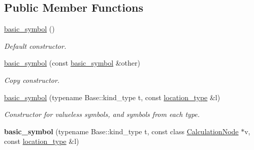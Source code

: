 \subsection*{Public Member Functions}
\begin{DoxyCompactItemize}
\item 
\hyperlink{structEzAquarii_1_1Parser_1_1basic__symbol_aa5567e1946efcc7e0d083d354d7a9748}{basic\+\_\+symbol} ()\hypertarget{structEzAquarii_1_1Parser_1_1basic__symbol_aa5567e1946efcc7e0d083d354d7a9748}{}\label{structEzAquarii_1_1Parser_1_1basic__symbol_aa5567e1946efcc7e0d083d354d7a9748}

\begin{DoxyCompactList}\small\item\em Default constructor. \end{DoxyCompactList}\item 
\hyperlink{structEzAquarii_1_1Parser_1_1basic__symbol_aae065b3313260ceb34ae03cdb68d2140}{basic\+\_\+symbol} (const \hyperlink{structEzAquarii_1_1Parser_1_1basic__symbol}{basic\+\_\+symbol} \&other)\hypertarget{structEzAquarii_1_1Parser_1_1basic__symbol_aae065b3313260ceb34ae03cdb68d2140}{}\label{structEzAquarii_1_1Parser_1_1basic__symbol_aae065b3313260ceb34ae03cdb68d2140}

\begin{DoxyCompactList}\small\item\em Copy constructor. \end{DoxyCompactList}\item 
\hyperlink{structEzAquarii_1_1Parser_1_1basic__symbol_a09d785a29250b9fbd37d749fc15f5a58}{basic\+\_\+symbol} (typename Base\+::kind\+\_\+type t, const \hyperlink{classEzAquarii_1_1Parser_acc4b937a827f1be285bf28ec90eeb125}{location\+\_\+type} \&l)\hypertarget{structEzAquarii_1_1Parser_1_1basic__symbol_a09d785a29250b9fbd37d749fc15f5a58}{}\label{structEzAquarii_1_1Parser_1_1basic__symbol_a09d785a29250b9fbd37d749fc15f5a58}

\begin{DoxyCompactList}\small\item\em Constructor for valueless symbols, and symbols from each type. \end{DoxyCompactList}\item 
{\bfseries basic\+\_\+symbol} (typename Base\+::kind\+\_\+type t, const class \hyperlink{classCalculationNode}{Calculation\+Node} $\ast$v, const \hyperlink{classEzAquarii_1_1Parser_acc4b937a827f1be285bf28ec90eeb125}{location\+\_\+type} \&l)\hypertarget{structEzAquarii_1_1Parser_1_1basic__symbol_afae6d4626a49350f5765cd498d4d5f27}{}\label{structEzAquarii_1_1Parser_1_1basic__symbol_afae6d4626a49350f5765cd498d4d5f27}


\end{DoxyCompactItemize}
